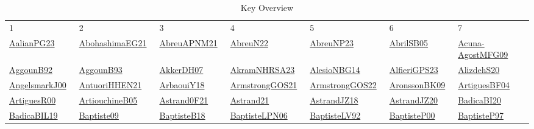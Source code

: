 {\scriptsize
\begin{longtable}{*{7}{l}}
\rowcolor{white}\caption{Key Overview}\\ \toprule
\rowcolor{white}1 & 2 & 3 & 4 & 5 & 6 & 7\\ \midrule
\endhead
\bottomrule
\endfoot
\href{works/AalianPG23.pdf}{AalianPG23}~\cite{AalianPG23} & \href{works/AbohashimaEG21.pdf}{AbohashimaEG21}~\cite{AbohashimaEG21} & \href{works/AbreuAPNM21.pdf}{AbreuAPNM21}~\cite{AbreuAPNM21} & \href{works/AbreuN22.pdf}{AbreuN22}~\cite{AbreuN22} & \href{}{AbreuNP23}~\cite{AbreuNP23} & \href{works/AbrilSB05.pdf}{AbrilSB05}~\cite{AbrilSB05} & \href{works/Acuna-AgostMFG09.pdf}{Acuna-AgostMFG09}~\cite{Acuna-AgostMFG09}\\ 
\href{}{AggounB92}~\cite{AggounB92} & \href{works/AggounB93.pdf}{AggounB93}~\cite{AggounB93} & \href{works/AkkerDH07.pdf}{AkkerDH07}~\cite{AkkerDH07} & \href{works/AkramNHRSA23.pdf}{AkramNHRSA23}~\cite{AkramNHRSA23} & \href{works/AlesioNBG14.pdf}{AlesioNBG14}~\cite{AlesioNBG14} & \href{works/AlfieriGPS23.pdf}{AlfieriGPS23}~\cite{AlfieriGPS23} & \href{}{AlizdehS20}~\cite{AlizdehS20}\\ 
\href{works/AngelsmarkJ00.pdf}{AngelsmarkJ00}~\cite{AngelsmarkJ00} & \href{works/AntuoriHHEN21.pdf}{AntuoriHHEN21}~\cite{AntuoriHHEN21} & \href{works/ArbaouiY18.pdf}{ArbaouiY18}~\cite{ArbaouiY18} & \href{works/ArmstrongGOS21.pdf}{ArmstrongGOS21}~\cite{ArmstrongGOS21} & \href{works/ArmstrongGOS22.pdf}{ArmstrongGOS22}~\cite{ArmstrongGOS22} & \href{works/AronssonBK09.pdf}{AronssonBK09}~\cite{AronssonBK09} & \href{works/ArtiguesBF04.pdf}{ArtiguesBF04}~\cite{ArtiguesBF04}\\ 
\href{works/ArtiguesR00.pdf}{ArtiguesR00}~\cite{ArtiguesR00} & \href{works/ArtiouchineB05.pdf}{ArtiouchineB05}~\cite{ArtiouchineB05} & \href{works/Astrand0F21.pdf}{Astrand0F21}~\cite{Astrand0F21} & \href{}{Astrand21}~\cite{Astrand21} & \href{works/AstrandJZ18.pdf}{AstrandJZ18}~\cite{AstrandJZ18} & \href{works/AstrandJZ20.pdf}{AstrandJZ20}~\cite{AstrandJZ20} & \href{works/BadicaBI20.pdf}{BadicaBI20}~\cite{BadicaBI20}\\ 
\href{works/BadicaBIL19.pdf}{BadicaBIL19}~\cite{BadicaBIL19} & \href{works/Baptiste09.pdf}{Baptiste09}~\cite{Baptiste09} & \href{works/BaptisteB18.pdf}{BaptisteB18}~\cite{BaptisteB18} & \href{}{BaptisteLPN06}~\cite{BaptisteLPN06} & \href{works/BaptisteLV92.pdf}{BaptisteLV92}~\cite{BaptisteLV92} & \href{works/BaptisteP00.pdf}{BaptisteP00}~\cite{BaptisteP00} & \href{works/BaptisteP97.pdf}{BaptisteP97}~\cite{BaptisteP97}\\ 

\end{longtable}}

